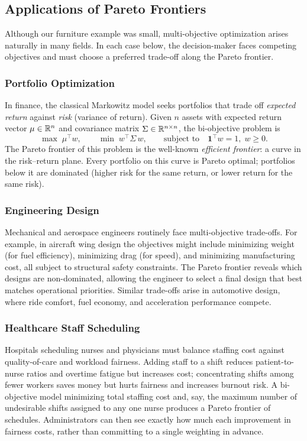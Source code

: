 \subsection{Applications of Pareto Frontiers}

Although our furniture example was small, multi-objective optimization arises naturally in many fields.  In each case below, the decision-maker faces competing objectives and must choose a preferred trade-off along the Pareto frontier.

\subsubsection{Portfolio Optimization}
In finance, the classical Markowitz model seeks portfolios that trade off \emph{expected return} against \emph{risk} (variance of return).  Given $n$ assets with expected return vector $\mu \in \mathbb{R}^n$ and covariance matrix $\Sigma \in \mathbb{R}^{n \times n}$, the bi-objective problem is
\[
\max \; \mu^\top w, \qquad \min \; w^\top \Sigma\, w, \qquad \text{subject to} \quad \mathbf{1}^\top w = 1, \; w \geq 0.
\]
The Pareto frontier of this problem is the well-known \emph{efficient frontier}: a curve in the risk--return plane.  Every portfolio on this curve is Pareto optimal; portfolios below it are dominated (higher risk for the same return, or lower return for the same risk).

\subsubsection{Engineering Design}
Mechanical and aerospace engineers routinely face multi-objective trade-offs.  For example, in aircraft wing design the objectives might include minimizing weight (for fuel efficiency), minimizing drag (for speed), and minimizing manufacturing cost, all subject to structural safety constraints.  The Pareto frontier reveals which designs are non-dominated, allowing the engineer to select a final design that best matches operational priorities.  Similar trade-offs arise in automotive design, where ride comfort, fuel economy, and acceleration performance compete.

\subsubsection{Healthcare Staff Scheduling}
Hospitals scheduling nurses and physicians must balance staffing cost against quality-of-care and workload fairness.  Adding staff to a shift reduces patient-to-nurse ratios and overtime fatigue but increases cost; concentrating shifts among fewer workers saves money but hurts fairness and increases burnout risk.  A bi-objective model minimizing total staffing cost and, say, the maximum number of undesirable shifts assigned to any one nurse produces a Pareto frontier of schedules.  Administrators can then see exactly how much each improvement in fairness costs, rather than committing to a single weighting in advance.

